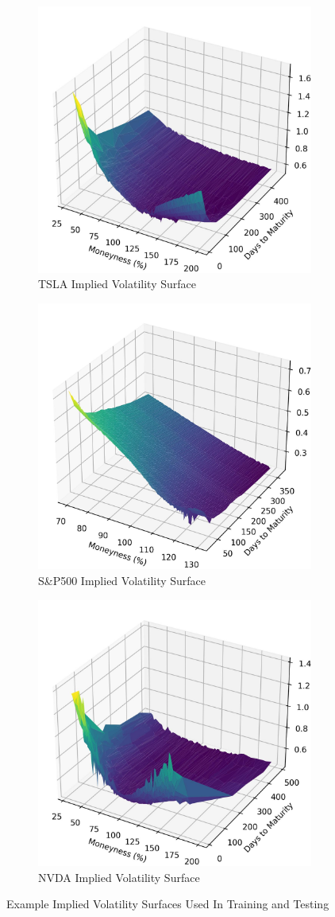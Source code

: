 \documentclass[10pt]{article}
\begin{document}
\begin{figure}[H]
\centering
\begin{subfigure}{.5\textwidth}
  \centering
  \includegraphics[width=0.5\linewidth]{TSLA_example_surface.jpeg}
  \caption{TSLA Implied Volatility Surface}
  \label{fig:sub1}
\end{subfigure}%
\begin{subfigure}{.5\textwidth}
  \centering
  \includegraphics[width=0.5\linewidth]{NVDA.jpg}
  \caption{S\&P500 Implied Volatility Surface}
  \label{fig:sub2}
\end{subfigure}
\begin{subfigure}{.5\textwidth}
    \centering 
    \includegraphics[width=0.5\linewidth]{SPX.jpg}
    \caption{NVDA Implied Volatility Surface}
    \label{fig:sub3}
\end{subfigure}
\caption{Example Implied Volatility Surfaces Used In Training and Testing}
\label{fig:test}
\end{figure}
\end{document}
